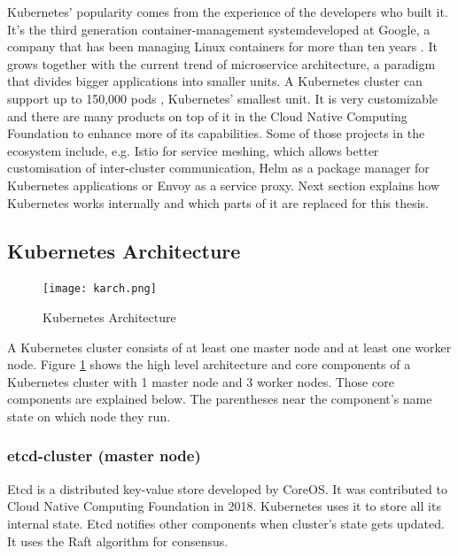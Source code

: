 Kubernetes' popularity comes from the experience of the developers who built it. It's the third generation container-management system\footnotemark developed at Google, a company that has been managing Linux containers for more than ten years \cite{acm-borg}. It grows together with the current trend of microservice architecture, a paradigm that divides bigger applications into smaller units. A Kubernetes cluster can support up to 150,000 pods \cite{kubernetes-load}, Kubernetes' smallest unit. It is very customizable and there are many products on top of it in the Cloud Native Computing Foundation to enhance more of its capabilities. Some of those projects in the ecosystem include, e.g. Istio for service meshing, which allows better customisation of inter-cluster communication, Helm as a package manager for Kubernetes applications or Envoy as a service proxy.
Next section explains how Kubernetes works internally and which parts of it are replaced for this thesis.

\subsection*{Kubernetes Architecture}
\begin{figure}[htpb]
  \centering
  \texttt{[image: karch.png]}
  \caption{Kubernetes Architecture \cite{kubewebsite}} \label{fig:kubearch}
  \end{figure}

  A Kubernetes cluster consists of at least one master node and at least one worker node. Figure \ref{fig:kubearch} shows the high level architecture and core components of a Kubernetes cluster with 1 master node and 3 worker nodes. Those core components are explained below. The parentheses near the component's name state on which node they run.

  \subsubsection*{etcd-cluster (master node)}
  Etcd \cite{etcd} is a distributed key-value store developed by CoreOS. It was contributed to Cloud Native Computing Foundation in 2018. Kubernetes uses it to store all its internal state. Etcd notifies other components when cluster's state gets updated. It uses the Raft algorithm \cite{raft} for consensus.

